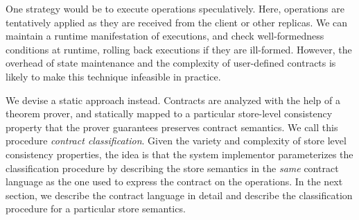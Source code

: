 One strategy would be to execute operations speculatively.  Here, operations
are tentatively applied as they are received from the client or other replicas.
We can maintain a runtime manifestation of executions, and check
well-formedness conditions at runtime, rolling back executions if they are
ill-formed. However, the overhead of state maintenance and the complexity of
user-defined contracts is likely to make this technique infeasible in practice.

We devise a static approach instead. Contracts are analyzed with the help of a
theorem prover, and statically mapped to a particular store-level consistency
property that the prover guarantees preserves contract semantics. We call this
procedure \emph{contract classification}. Given the variety and complexity of
store level consistency properties, the idea is that the system implementor
parameterizes the classification procedure by describing the store semantics in
the \emph{same} contract language as the one used to express the contract on
the operations. In the next section, we describe the contract language in
detail and describe the classification procedure for a particular store
semantics.
